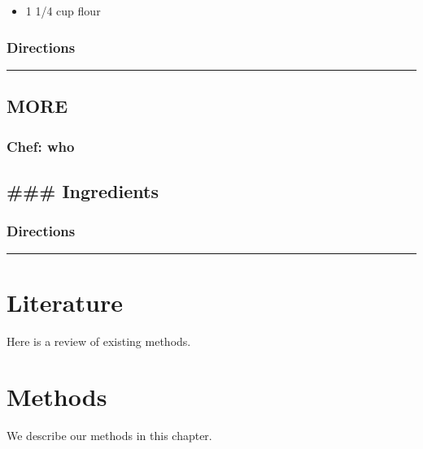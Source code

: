 \documentclass[
]{book}
\providecommand{\tightlist}{%
  \setlength{\itemsep}{0pt}\setlength{\parskip}{0pt}}
\begin{document}
\begin{itemize}
\tightlist
\item
  1 1/4 cup flour
\end{itemize}

\hypertarget{directions-100}{%
\subsection*{Directions}\label{directions-100}}


\begin{center}\rule{0.5\linewidth}{0.5pt}\end{center}

\hypertarget{more-6}{%
\section*{MORE}\label{more-6}}


\hypertarget{chef-who-6}{%
\subsection*{Chef: who}\label{chef-who-6}}


\hypertarget{ingredients-101}{%
\section*{\#\#\# Ingredients}\label{ingredients-101}}


\hypertarget{directions-101}{%
\subsection*{Directions}\label{directions-101}}


\begin{center}\rule{0.5\linewidth}{0.5pt}\end{center}

\hypertarget{literature}{%
\chapter{Literature}\label{literature}}

Here is a review of existing methods.

\hypertarget{methods}{%
\chapter{Methods}\label{methods}}

We describe our methods in this chapter.
\end{document}
